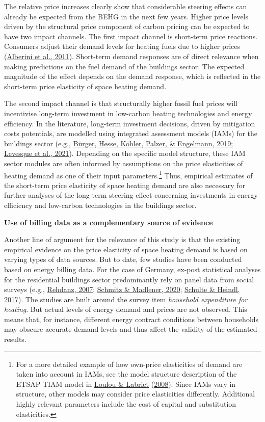\documentclass[12pt,twoside]{reedthesis}
\begin{document}
The relative price increases clearly show that considerable steering effects can already be expected from the BEHG in the next few years. Higher price levels driven by the structural price component of carbon pricing can be expected to have two impact channels. The first impact channel is short-term price reactions. Consumers adjust their demand levels for heating fuels due to higher prices (\protect\hyperlink{ref-alberini_etal11}{Alberini et al., 2011}). Short-term demand responses are of direct relevance when making predictions on the fuel demand of the buildings sector. The expected magnitude of the effect depends on the demand response, which is reflected in the short-term price elasticity of space heating demand.

The second impact channel is that structurally higher fossil fuel prices will incentivise long-term investment in low-carbon heating technologies and energy efficiency. In the literature, long-term investment decisions, driven by mitigation costs potentials, are modelled using integrated assessment models (IAMs) for the buildings sector (e.g., \protect\hyperlink{ref-burger_etal19}{Bürger, Hesse, Köhler, Palzer, \& Engelmann, 2019}; \protect\hyperlink{ref-levesque_etal21}{Levesque et al., 2021}). Depending on the specific model structure, these IAM sector modules are often informed by assumptions on the price elasticities of heating demand as one of their input parameters.\footnote{For a more detailed example of how own-price elasticities of demand are taken into account in IAMs, see the model structure description of the ETSAP TIAM model in \protect\hyperlink{ref-loulou_labriet08}{Loulou \& Labriet} (\protect\hyperlink{ref-loulou_labriet08}{2008}). Since IAMs vary in structure, other models may consider price elasticities differently. Additional highly relevant parameters include the cost of capital and substitution elasticities.} Thus, empirical estimates of the short-term price elasticity of space heating demand are also necessary for further analyses of the long-term steering effect concerning investments in energy efficiency and low-carbon technologies in the buildings sector.

\textbf{Use of billing data as a complementary source of evidence}

Another line of argument for the relevance of this study is that the existing empirical evidence on the price elasticity of space heating demand is based on varying types of data sources. But to date, few studies have been conducted based on energy billing data. For the case of Germany, ex-post statistical analyses for the residential buildings sector predominantly rely on panel data from social surveys (e.g., \protect\hyperlink{ref-rehdanz07}{Rehdanz, 2007}; \protect\hyperlink{ref-schmitz_madlener20}{Schmitz \& Madlener, 2020}; \protect\hyperlink{ref-schulte_heindl17}{Schulte \& Heindl, 2017}). The studies are built around the survey item \emph{household expenditure for heating}. But actual levels of energy demand and prices are not observed. This means that, for instance, different energy contract conditions between households may obscure accurate demand levels and thus affect the validity of the estimated results.
\end{document}
